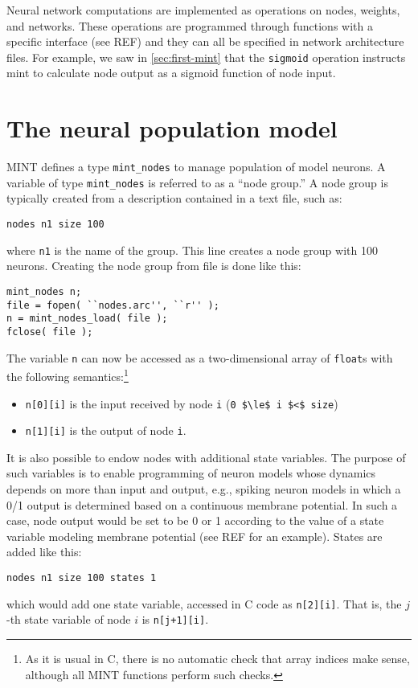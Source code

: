 \documentclass[12pt,letterpaper]{memoir}
\newcommand{\mint}{MINT\xspace}
\begin{document}
Neural network computations are implemented as operations on nodes,
weights, and networks. These operations are programmed through
functions with a specific interface (see REF) and they can all be
specified in network architecture files. For example, we saw in
\ref{sec:first-mint} that the \lstinline{sigmoid} operation instructs
mint to calculate node output as a sigmoid function of node input.

\section{The neural population model}

\mint defines a type \lstinline{mint_nodes} to manage population of
model neurons. A variable of type \lstinline{mint_nodes} is referred
to as a ``node group.'' A node group is typically created from a
description contained in a text file, such as:
\begin{lstlisting}
nodes n1 size 100
\end{lstlisting}
where \lstinline{n1} is the name of the group. This line creates a node group with 100 neurons. Creating the node group from file is done like this:
\begin{lstlisting}
mint_nodes n;
file = fopen( ``nodes.arc'', ``r'' );
n = mint_nodes_load( file );
fclose( file );
\end{lstlisting}
The variable \lstinline{n} can now be accessed as a two-dimensional
array of \lstinline{float}s with the following semantics:\footnote{As
  it is usual in C, there is no automatic check that array indices
  make sense, although all \mint functions perform such checks.}
\begin{itemize}
\item \lstinline{n[0][i]} is the input received by node \lstinline{i}
  (\lstinline{0 $\le$ i $<$ size})
\item \lstinline{n[1][i]} is the output of node \lstinline{i}.
\end{itemize}

It is also possible to endow nodes with additional state
variables. The purpose of such variables is to enable programming of
neuron models whose dynamics depends on more than input and output,
e.g., spiking neuron models in which a 0/1 output is determined based
on a continuous membrane potential. In such a case, node output would
be set to be 0 or 1 according to the value of a state variable
modeling membrane potential (see REF for an example). States are added
like this:
\begin{lstlisting}
nodes n1 size 100 states 1
\end{lstlisting}
which would add one state variable, accessed in C code as
\lstinline{n[2][i]}. That is, the $j$-th state variable of node $i$ is
\lstinline{n[j+1][i]}.
\end{document}
